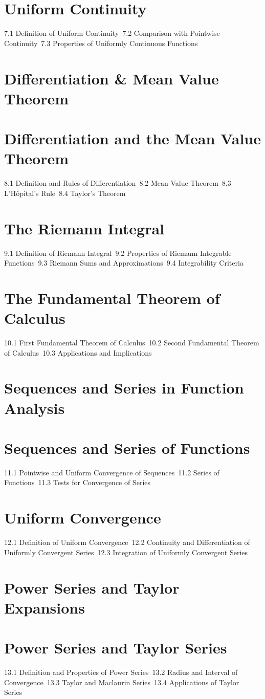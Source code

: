 \section{Uniform Continuity}
7.1 Definition of Uniform Continuity\
7.2 Comparison with Pointwise Continuity\
7.3 Properties of Uniformly Continuous Functions\
\section{Differentiation \& Mean Value Theorem}
\section{Differentiation and the Mean Value Theorem}
8.1 Definition and Rules of Differentiation\
8.2 Mean Value Theorem\
8.3 L'Hôpital's Rule\
8.4 Taylor's Theorem\
\section{The Riemann Integral}
9.1 Definition of Riemann Integral\
9.2 Properties of Riemann Integrable Functions\
9.3 Riemann Sums and Approximations\
9.4 Integrability Criteria\
\section{The Fundamental Theorem of Calculus}
10.1 First Fundamental Theorem of Calculus\
10.2 Second Fundamental Theorem of Calculus\
10.3 Applications and Implications\
\section{Sequences and Series in Function Analysis}
\section{Sequences and Series of Functions}
11.1 Pointwise and Uniform Convergence of Sequences\
11.2 Series of Functions\
11.3 Tests for Convergence of Series\
\section{Uniform Convergence}
12.1 Definition of Uniform Convergence\
12.2 Continuity and Differentiation of Uniformly Convergent Series\
12.3 Integration of Uniformly Convergent Series\
\section{Power Series and Taylor Expansions}
\section{Power Series and Taylor Series}
13.1 Definition and Properties of Power Series\
13.2 Radius and Interval of Convergence\
13.3 Taylor and Maclaurin Series\
13.4 Applications of Taylor Series\
